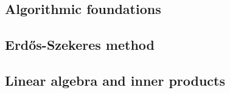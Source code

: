 \subsection{Algorithmic foundations}




\subsection{Erdős-Szekeres method}



\subsection{Linear algebra and inner products}

